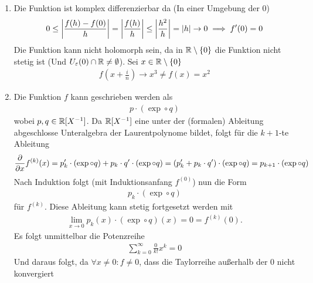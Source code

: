 \documentclass[ngerman]{report}
\begin{document}
    \begin{answer}
        \begin{enumerate}
            \item Die Funktion ist komplex differenzierbar da (In einer Umgebung der $0$)
            \begin{align*}
                0\leq \left|\frac{f(h)-f(0)}{h}\right| = \left|\frac{f(h)}{h}\right|\leq \left|\frac{h^2}{h}\right| = \left|h\right| \to 0\implies f'(0) = 0
            \end{align*}
            Die Funktion kann nicht holomorph sein, da in $\mathbb{R}\setminus\{0\}$ die Funktion nicht stetig ist (Und $U_\varepsilon(0)\cap\mathbb{R}\neq\emptyset$). Sei $x \in \mathbb{R}\setminus\{0\}$
            \begin{align*}
                f\left(x+\frac{i}{n}\right) \to x^3\neq f(x) = x^2
            \end{align*}
            \item Die Funktion $f$ kann geschrieben werden als
            \begin{align*}
                p \cdot (\exp\circ q)
            \end{align*} 
            wobei $p,q \in \mathbb{R}[X^{-1}]$. Da $\mathbb{R}[X^{-1}]$ eine unter der (formalen) Ableitung abgeschlosse Unteralgebra der Laurentpolynome bildet, folgt für die $k+1$-te Ableitung 
            \begin{align*}
                \frac{\partial }{\partial x}f^{(k)}(x) = p'_k\cdot (\exp\circ q)+p_k\cdot q'\cdot (\exp\circ q) = (p_k'+p_k\cdot q')\cdot (\exp\circ q) = p_{k+1}\cdot(\exp \circ q)
            \end{align*} 
            Nach Induktion folgt (mit Induktionsanfang $f^{(0)}$) nun die Form 
            \begin{align*}
                p_k \cdot (\exp\circ q)
            \end{align*} 
            für $f^{(k)}$. Diese Ableitung kann stetig fortgesetzt werden mit 
            \begin{align*}
                \lim_{x\to 0} p_k(x) \cdot (\exp\circ q)(x) = 0 = f^{(k)}(0).
            \end{align*}
            Es folgt unmittelbar die Potenzreihe
            \begin{align*}
                \sum_{k=0}^\infty \frac{0}{k!}x^k = 0
            \end{align*}
            Und daraus folgt, da $\forall x\neq 0:f\neq 0$, dass die Taylorreihe außerhalb der $0$ nicht konvergiert
        \end{enumerate}
    \end{answer}
\end{document}
